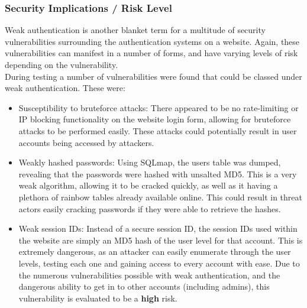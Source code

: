 \documentclass{report}
\begin{document}
\subsubsection{Security Implications / Risk Level}
Weak authentication is another blanket term for a multitude of security vulnerabilities surrounding the authentication systems on a website. Again, these vulnerabilities can manifest in a number of forms, and have varying levels of risk depending on the vulnerability.\\
During testing a number of vulnerabilities were found that could be classed under weak authentication. These were:
\begin{itemize}
	\item Susceptibility to bruteforce attacks: There appeared to be no rate-limiting or IP blocking functionality on the website login form, allowing for bruteforce attacks to be performed easily. These attacks could potentially result in user accounts being accessed by attackers.
	\item Weakly hashed passwords: Using SQLmap, the users table was dumped, revealing that the passwords were hashed with unsalted MD5. This is a very weak algorithm, allowing it to be cracked quickly, as well as it having a plethora of rainbow tables already available online. This could result in threat actors easily cracking passwords if they were able to retrieve the hashes.
	\item Weak session IDs: Instead of a secure session ID, the session IDs used within the website are simply an MD5 hash of the user level for that account. This is extremely dangerous, as an attacker can easily enumerate through the user levels, testing each one and gaining access to every account with ease.
Due to the numerous vulnerabilities possible with weak authentication, and the dangerous ability to get in to other accounts (including admins), this vulnerability is evaluated to be a \textbf{high} risk.
\end{itemize}
\end{document}
